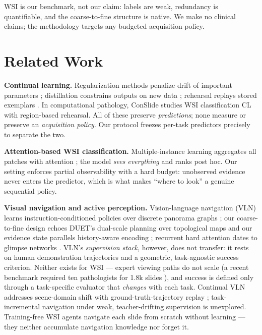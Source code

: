 \documentclass{article}
\begin{document}
WSI is our benchmark, not our claim: labels are weak, redundancy is
quantifiable, and the coarse-to-fine structure is native. We make no clinical
claims; the methodology targets any budgeted acquisition policy.

\section{Related Work}
\label{sec:related}

\textbf{Continual learning.} Regularization methods penalize drift of
important parameters \cite{kirkpatrick2017ewc}; distillation constrains
outputs on new data \cite{li2017lwf}; rehearsal replays stored exemplars
\cite{rebuffi2017icarl,chaudhry2019er}. In computational pathology, ConSlide
\cite{huang2023conslide} studies WSI classification CL with region-based
rehearsal. All of these preserve \emph{predictions}; none measure or preserve
an \emph{acquisition policy}. Our protocol freezes per-task predictors
precisely to separate the two.

\textbf{Attention-based WSI classification.} Multiple-instance learning
aggregates all patches with attention \cite{ilse2018abmil,lu2021clam}; the
model \emph{sees everything} and ranks post hoc. Our setting enforces partial
observability with a hard budget: unobserved evidence never enters the
predictor, which is what makes ``where to look'' a genuine sequential policy.

\textbf{Visual navigation and active perception.} Vision-language navigation
(VLN) learns instruction-conditioned policies over discrete panorama graphs
\cite{anderson2018r2r}; our coarse-to-fine design echoes DUET's dual-scale
planning over topological maps \cite{chen2022duet} and our evidence state
parallels history-aware encoding \cite{chen2021hamt}; recurrent hard
attention dates to glimpse networks \cite{mnih2014ram}. VLN's
\emph{supervision stack}, however, does not transfer: it rests on human
demonstration trajectories and a geometric, task-agnostic success criterion.
Neither exists for WSI --- expert viewing paths do not scale (a recent
benchmark required ten pathologists for 1.8k slides
\cite{pathagentbench2026}), and success is defined only through a
task-specific evaluator that \emph{changes} with each task. Continual VLN
addresses scene-domain shift with ground-truth-trajectory replay
\cite{jeong2025cvln}; task-incremental navigation under weak,
teacher-drifting supervision is unexplored. Training-free WSI agents
\cite{pathagent2026,pathnavigate2026} navigate each slide from scratch
without learning --- they neither accumulate navigation knowledge nor
forget it.
\end{document}
